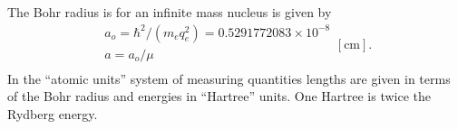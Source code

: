 The Bohr radius is for an infinite mass nucleus is given by
\begin{equation}
\begin{array}{l}
 {a_o} = {{{\hbar ^2}}/
\left( {{m_e}q_e^2} \right)} = 0.5291772083
\times {10^{ - 8}} \\
 a = {{{a_o}} /\mu } \\
 \end{array}[\mathrm{cm}].
\end{equation}
In the ``atomic units'' system of measuring quantities lengths are given
in terms of the Bohr radius and energies in ``Hartree'' units.  One Hartree
is twice the Rydberg energy.
